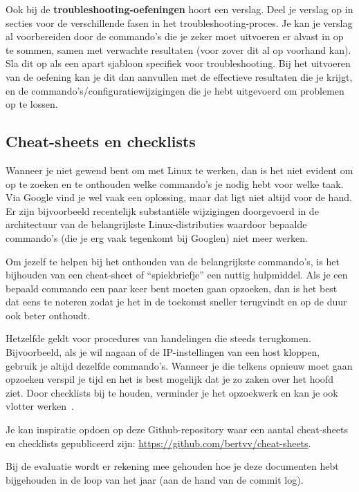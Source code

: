 Ook bij de \textbf{troubleshooting-oefeningen} hoort een verslag. Deel je verslag op in secties voor de verschillende fasen in het troubleshooting-proces. Je kan je verslag al voorbereiden door de commando's die je zeker moet uitvoeren er alvast in op te sommen, samen met verwachte resultaten (voor zover dit al op voorhand kan). Sla dit op als een apart sjabloon specifiek voor troubleshooting. Bij het uitvoeren van de oefening kan je dit dan aanvullen met de effectieve resultaten die je krijgt, en de commando's/configuratiewijzigingen die je hebt uitgevoerd om problemen op te lossen.

\subsection{Cheat-sheets en checklists}
\label{subs:cheat-sheets-en-checklists}

Wanneer je niet gewend bent om met Linux te werken, dan is het niet evident om op te zoeken en te onthouden welke commando's je nodig hebt voor welke taak. Via Google vind je wel vaak een oplossing, maar dat ligt niet altijd voor de hand. Er zijn bijvoorbeeld recentelijk substantiële wijzigingen doorgevoerd in de architectuur van de belangrijkste Linux-distributies waardoor bepaalde commando's (die je erg vaak tegenkomt bij Googlen) niet meer werken.

Om jezelf te helpen bij het onthouden van de belangrijkste commando's, is het bijhouden van een cheat-sheet of ``spiekbriefje'' een nuttig hulpmiddel. Als je een bepaald commando een paar keer bent moeten gaan opzoeken, dan is het best dat eens te noteren zodat je het in de toekomst sneller terugvindt en op de duur ook beter onthoudt.

Hetzelfde geldt voor procedures van handelingen die steeds terugkomen.  Bijvoorbeeld, als je wil nagaan of de IP-instellingen van een host kloppen, gebruik je altijd dezelfde commando's. Wanneer je die telkens opnieuw moet gaan opzoeken verspil je tijd en het is best mogelijk dat je zo zaken over het hoofd ziet. Door checklists bij te houden, verminder je het opzoekwerk en kan je ook vlotter werken~\autocite{Simmons2009}.

Je kan inspiratie opdoen op deze Github-repository waar een aantal cheat-sheets en checklists gepubliceerd zijn: \url{https://github.com/bertvv/cheat-sheets}.

Bij de evaluatie wordt er rekening mee gehouden hoe je deze documenten hebt bijgehouden in de loop van het jaar (aan de hand van de commit log).

